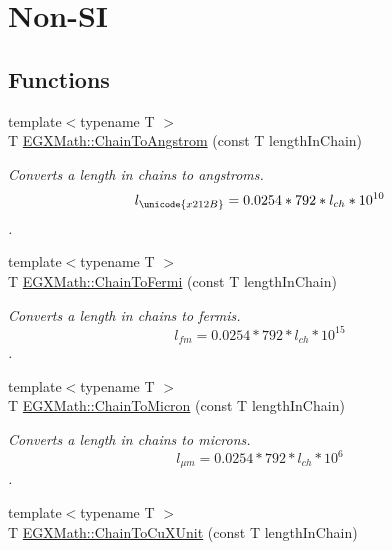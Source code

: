 \hypertarget{group___e_g_x_math-_conversions-_length_conversions-_imperial-_chain-_non-_s_i}{}\section{Non-\/\+SI}
\label{group___e_g_x_math-_conversions-_length_conversions-_imperial-_chain-_non-_s_i}
\subsection*{Functions}
\begin{DoxyCompactItemize}
\item 
{\footnotesize template$<$typename T $>$ }\\T \mbox{\hyperlink{group___e_g_x_math-_conversions-_length_conversions-_imperial-_chain-_non-_s_i_ga89e870762310908510aad80d26dc1942}{E\+G\+X\+Math\+::\+Chain\+To\+Angstrom}} (const T length\+In\+Chain)
\begin{DoxyCompactList}\small\item\em Converts a length in chains to angstroms. \[ l_{\unicode{x212B}}=0.0254 * 792 * l_{ch} * 10^{10} \]. \end{DoxyCompactList}\item 
{\footnotesize template$<$typename T $>$ }\\T \mbox{\hyperlink{group___e_g_x_math-_conversions-_length_conversions-_imperial-_chain-_non-_s_i_ga88b0e20b062ca36346a6daeb5052c40a}{E\+G\+X\+Math\+::\+Chain\+To\+Fermi}} (const T length\+In\+Chain)
\begin{DoxyCompactList}\small\item\em Converts a length in chains to fermis. \[ l_{fm}=0.0254 * 792 * l_{ch} * 10^{15} \]. \end{DoxyCompactList}\item 
{\footnotesize template$<$typename T $>$ }\\T \mbox{\hyperlink{group___e_g_x_math-_conversions-_length_conversions-_imperial-_chain-_non-_s_i_ga9efe9ceb0ab30639026cbb4158bb0148}{E\+G\+X\+Math\+::\+Chain\+To\+Micron}} (const T length\+In\+Chain)
\begin{DoxyCompactList}\small\item\em Converts a length in chains to microns. \[ l_{\mu m}=0.0254 * 792 * l_{ch} * 10^{6} \]. \end{DoxyCompactList}\item 
{\footnotesize template$<$typename T $>$ }\\T \mbox{\hyperlink{group___e_g_x_math-_conversions-_length_conversions-_imperial-_chain-_non-_s_i_ga4d49e29ef32b64b7a433ffe76447cf5f}{E\+G\+X\+Math\+::\+Chain\+To\+Cu\+X\+Unit}} (const T length\+In\+Chain)

\end{DoxyCompactItemize}
